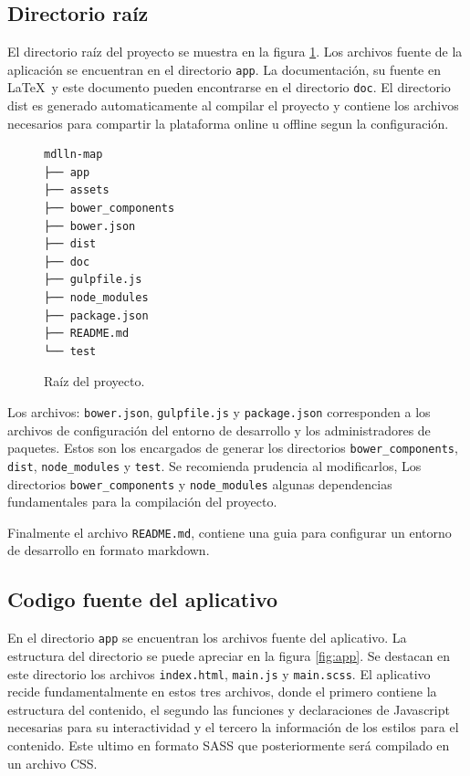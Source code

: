 \documentclass[11pt,letterpaper]{article}
\begin{document}
\subsection{Directorio raíz}
El directorio raíz del proyecto se muestra en la figura \ref{fig:root}. Los archivos fuente de la aplicación se encuentran en el directorio {\tt app}. La documentación, su fuente en \LaTeX\ y este documento pueden encontrarse en el directorio {\tt doc}. El directorio dist es generado automaticamente al compilar el proyecto y contiene los archivos necesarios para compartir la plataforma online u offline segun la configuración. 

\begin{figure}[ht]
\centering
\begin{BVerbatim}
mdlln-map
├── app
├── assets
├── bower_components
├── bower.json
├── dist
├── doc
├── gulpfile.js
├── node_modules
├── package.json
├── README.md
└── test
\end{BVerbatim}
\caption{Raíz del proyecto.}\label{fig:root}
\end{figure}

Los archivos: {\tt bower.json}, {\tt gulpfile.js} y {\tt package.json} corresponden a los archivos de configuración del entorno de desarrollo y los administradores de paquetes. Estos son los encargados de generar los directorios {\tt bower\_components}, {\tt dist}, {\tt node\_modules} y {\tt test}. Se recomienda prudencia al modificarlos, Los directorios {\tt bower\_components} y {\tt node\_modules} algunas dependencias fundamentales para la compilación del proyecto.

Finalmente el archivo {\tt README.md}, contiene una guia para configurar un entorno de desarrollo en formato markdown.

\subsection{Codigo fuente del aplicativo}

En el directorio {\tt app} se encuentran los archivos fuente del aplicativo. La estructura del directorio se puede apreciar en la figura \ref{fig:app}. Se destacan en este directorio los archivos {\tt index.html}, {\tt main.js} y {\tt main.scss}. El aplicativo recide fundamentalmente en estos tres archivos, donde el primero contiene la estructura del contenido, el segundo las funciones y declaraciones de Javascript necesarias para su interactividad y el tercero la información de los estilos para el contenido. Este ultimo en formato SASS \cite{sass} que posteriormente será compilado en un archivo CSS.
\end{document}

